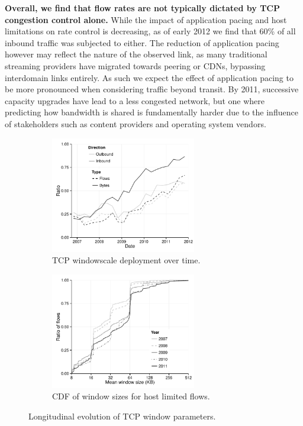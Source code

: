 \textbf{Overall, we find that flow rates are not typically dictated by TCP congestion control alone.}
While the impact of application pacing and host limitations on rate control is decreasing, as of early 2012 we find that 60\% of all inbound traffic was subjected to either. 
The reduction of application pacing however may reflect the nature of the observed link, as many traditional streaming providers have migrated towards peering or CDNs, bypassing interdomain links entirely. As such we expect the effect of application pacing to be more pronounced when considering traffic beyond transit.
By 2011, successive capacity upgrades have lead to a less congested network, but one where predicting how bandwidth is shared is fundamentally harder due to the influence of stakeholders such as content providers and operating system vendors.

\begin{figure}[t]
    \begin{subfigure}[b]{.5\linewidth}
        \centering
        \includegraphics[width=2.5in]{figures/malawi/windowscale}
        \caption{TCP windowscale deployment over time. \label{fig:windowscale}}
    \end{subfigure}%
    \begin{subfigure}[b]{.5\linewidth}
        \centering
        \includegraphics[width=2.5in]{figures/malawi/hostwindow}
        \caption{CDF of window sizes for host limited flows.\label{fig:hostwindow}}
    \end{subfigure}%
    \caption{Longitudinal evolution of TCP window parameters. \label{fig:tcpWindowParams}}
\end{figure}

